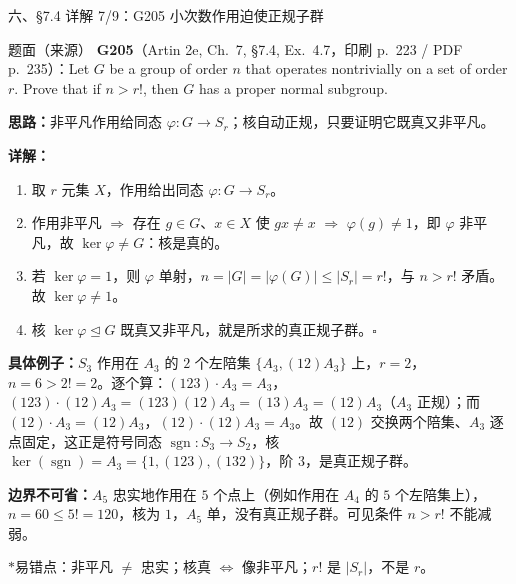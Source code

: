 \documentclass[aspectratio=169,10pt,fontset=none]{ctexbeamer}
\newcommand{\ex}[1]{\textcolor{accent}{\footnotesize\bfseries #1}}
\newcommand{\key}[1]{\textcolor{ink}{\bfseries #1}}
\newcommand{\starpt}{\textcolor{accent}{\bfseries$\ast$}}
\begin{document}
\begin{frame}[t]{六、\S7.4 详解 7/9：G205 小次数作用迫使正规子群}
\label{ex:G205}
\scriptsize
\begin{block}{\footnotesize 题面（来源）}
\ex{G205}（Artin 2e, Ch.~7, \S7.4, Ex.~4.7，印刷 p.~223 / PDF p.~235）：Let $G$ be a group of order $n$ that operates nontrivially on a set of order $r$. Prove that if $n>r!$, then $G$ has a proper normal subgroup.
\end{block}
\key{思路：}非平凡作用给同态 $\varphi:G\to S_r$；核自动正规，只要证明它既真又非平凡。

\key{详解：}
\begin{enumerate}\setlength{\itemsep}{1pt}
\item 取 $r$ 元集 $X$，作用给出同态 $\varphi:G\to S_r$。
\item 作用非平凡 $\Rightarrow$ 存在 $g\in G$、$x\in X$ 使 $gx\ne x$ $\Rightarrow$ $\varphi(g)\ne1$，即 $\varphi$ 非平凡，故 $\ker\varphi\ne G$：核是真的。
\item 若 $\ker\varphi=1$，则 $\varphi$ 单射，$n=|G|=|\varphi(G)|\le|S_r|=r!$，与 $n>r!$ 矛盾。故 $\ker\varphi\ne1$。
\item 核 $\ker\varphi\trianglelefteq G$ 既真又非平凡，就是所求的真正规子群。$\square$
\end{enumerate}
\key{具体例子：}$S_3$ 作用在 $A_3$ 的 $2$ 个左陪集 $\{A_3,(12)A_3\}$ 上，$r=2$，$n=6>2!=2$。逐个算：$(123)\cdot A_3=A_3$，$(123)\cdot(12)A_3=(123)(12)A_3=(13)A_3=(12)A_3$（$A_3$ 正规）；而 $(12)\cdot A_3=(12)A_3$，$(12)\cdot(12)A_3=A_3$。故 $(12)$ 交换两个陪集、$A_3$ 逐点固定，这正是符号同态 $\operatorname{sgn}:S_3\to S_2$，核 $\ker(\operatorname{sgn})=A_3=\{1,(123),(132)\}$，阶 $3$，是真正规子群。

\key{边界不可省：}$A_5$ 忠实地作用在 $5$ 个点上（例如作用在 $A_4$ 的 $5$ 个左陪集上），$n=60\le5!=120$，核为 $1$，$A_5$ 单，没有真正规子群。可见条件 $n>r!$ 不能减弱。

\starpt 易错点：非平凡 $\ne$ 忠实；核真 $\Leftrightarrow$ 像非平凡；$r!$ 是 $|S_r|$，不是 $r$。
\end{frame}
\end{document}

